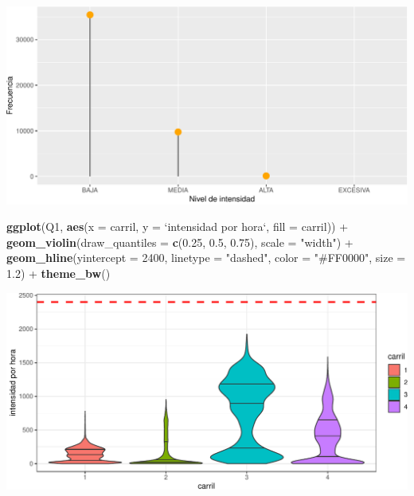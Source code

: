 \documentclass[]{article}
\newenvironment{Shaded}{\begin{snugshade}}{\end{snugshade}}
\newcommand{\KeywordTok}[1]{\textcolor[rgb]{0.13,0.29,0.53}{\textbf{{#1}}}}
\newcommand{\DataTypeTok}[1]{\textcolor[rgb]{0.13,0.29,0.53}{{#1}}}
\newcommand{\DecValTok}[1]{\textcolor[rgb]{0.00,0.00,0.81}{{#1}}}
\newcommand{\FloatTok}[1]{\textcolor[rgb]{0.00,0.00,0.81}{{#1}}}
\newcommand{\StringTok}[1]{\textcolor[rgb]{0.31,0.60,0.02}{{#1}}}
\newcommand{\NormalTok}[1]{{#1}}
\begin{document}
\begin{center}\includegraphics{./figure/unnamed-chunk-6-1} \end{center}

\begin{Shaded}
\begin{Highlighting}[]
  \KeywordTok{ggplot}\NormalTok{(Q1, }\KeywordTok{aes}\NormalTok{(}\DataTypeTok{x =} \NormalTok{carril, }\DataTypeTok{y =} \StringTok{`}\DataTypeTok{intensidad por hora}\StringTok{`}\NormalTok{, }\DataTypeTok{fill =} \NormalTok{carril)) +}\StringTok{ }
\StringTok{    }\KeywordTok{geom_violin}\NormalTok{(}\DataTypeTok{draw_quantiles =} \KeywordTok{c}\NormalTok{(}\FloatTok{0.25}\NormalTok{, }\FloatTok{0.5}\NormalTok{, }\FloatTok{0.75}\NormalTok{), }\DataTypeTok{scale =} \StringTok{"width"}\NormalTok{) +}
\StringTok{    }\KeywordTok{geom_hline}\NormalTok{(}\DataTypeTok{yintercept =} \DecValTok{2400}\NormalTok{, }\DataTypeTok{linetype =} \StringTok{"dashed"}\NormalTok{, }\DataTypeTok{color =} \StringTok{"#FF0000"}\NormalTok{, }\DataTypeTok{size =} \FloatTok{1.2}\NormalTok{) +}
\StringTok{    }\KeywordTok{theme_bw}\NormalTok{()}
\end{Highlighting}
\end{Shaded}

\begin{center}\includegraphics{./figure/unnamed-chunk-6-2} \end{center}
\end{document}
